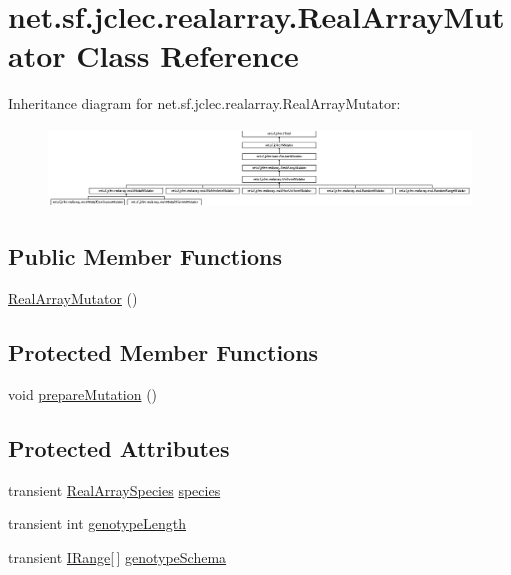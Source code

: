 \hypertarget{classnet_1_1sf_1_1jclec_1_1realarray_1_1_real_array_mutator}{\section{net.\-sf.\-jclec.\-realarray.\-Real\-Array\-Mutator Class Reference}
\label{classnet_1_1sf_1_1jclec_1_1realarray_1_1_real_array_mutator}
}
Inheritance diagram for net.\-sf.\-jclec.\-realarray.\-Real\-Array\-Mutator\-:\begin{figure}[H]
\begin{center}
\leavevmode
\includegraphics[height=2.128122cm]{classnet_1_1sf_1_1jclec_1_1realarray_1_1_real_array_mutator}
\end{center}
\end{figure}
\subsection*{Public Member Functions}
\begin{DoxyCompactItemize}
\item 
\hyperlink{classnet_1_1sf_1_1jclec_1_1realarray_1_1_real_array_mutator_a583eca62e2fbcea1ce7c6aeb5ba6eab6}{Real\-Array\-Mutator} ()
\end{DoxyCompactItemize}
\subsection*{Protected Member Functions}
\begin{DoxyCompactItemize}
\item 
void \hyperlink{classnet_1_1sf_1_1jclec_1_1realarray_1_1_real_array_mutator_a6fbfa9c56e7c6e3af8532636dd0ceb60}{prepare\-Mutation} ()
\end{DoxyCompactItemize}
\subsection*{Protected Attributes}
\begin{DoxyCompactItemize}
\item 
transient \hyperlink{classnet_1_1sf_1_1jclec_1_1realarray_1_1_real_array_species}{Real\-Array\-Species} \hyperlink{classnet_1_1sf_1_1jclec_1_1realarray_1_1_real_array_mutator_ab32eb06096bd2c5f6bc2ed29a16304fc}{species}
\item 
transient int \hyperlink{classnet_1_1sf_1_1jclec_1_1realarray_1_1_real_array_mutator_ae64eaf5a204082d653c2835187d7bc4c}{genotype\-Length}
\item 
transient \hyperlink{interfacenet_1_1sf_1_1jclec_1_1util_1_1range_1_1_i_range}{I\-Range}\mbox{[}$\,$\mbox{]} \hyperlink{classnet_1_1sf_1_1jclec_1_1realarray_1_1_real_array_mutator_a42aae3ccf5bf754d3556eac85d2ad56a}{genotype\-Schema}
\end{DoxyCompactItemize}


